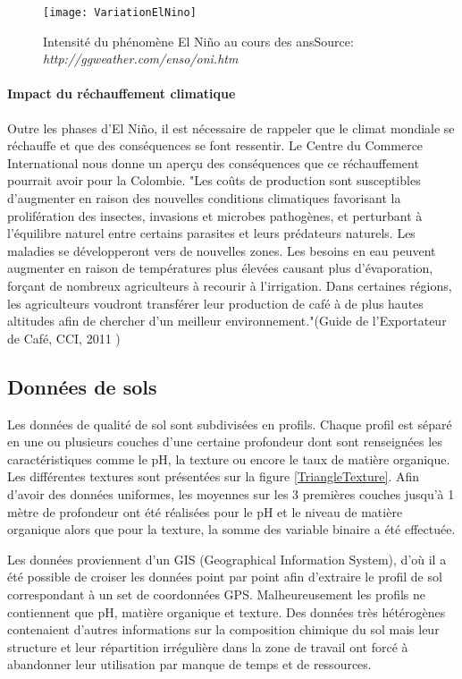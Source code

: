 \begin{figure}[H]
	\texttt{[image: VariationElNino]}
	\caption{\label{Nino} Intensité du phénomène El Niño au cours des ans\newline Source: \textit{http://ggweather.com/enso/oni.htm}}
\end{figure}

\paragraph{Impact du réchauffement climatique} Outre les phases d'El Niño, il est nécessaire de rappeler que le climat mondiale se réchauffe et que des conséquences se font ressentir. Le Centre du Commerce International \cite{CCI} nous donne un aperçu des conséquences que ce réchauffement pourrait avoir pour la Colombie. "Les coûts de production sont susceptibles d'augmenter en raison des nouvelles conditions climatiques favorisant la prolifération des insectes, invasions et microbes pathogènes, et perturbant à l'équilibre naturel entre certains parasites et leurs prédateurs naturels. Les maladies se développeront vers de nouvelles zones. Les besoins en eau peuvent augmenter en raison de températures plus élevées causant plus d'évaporation, forçant de nombreux agriculteurs à recourir à l'irrigation. Dans certaines régions, les agriculteurs voudront transférer leur production de café à de plus hautes altitudes afin de chercher d'un meilleur environnement."(Guide de l'Exportateur de Café, CCI, 2011 \cite{GuideCafe})


\subsection{Données de sols} 
Les données de qualité de sol sont subdivisées en profils. Chaque profil est séparé en une ou plusieurs couches d’une certaine profondeur dont sont renseignées les caractéristiques comme le pH, la texture ou encore le taux de matière organique. Les différentes textures sont présentées sur la figure \ref{TriangleTexture}. Afin d'avoir des données uniformes, les moyennes sur les 3 premières couches jusqu'à 1 mètre de profondeur ont été réalisées pour le pH et le niveau de matière organique alors que pour la texture, la somme des variable binaire a été effectuée. 

Les données proviennent d'un GIS (Geographical Information System), d'où il a été possible de croiser les données point par point afin d'extraire le profil de sol correspondant à un set de coordonnées GPS. Malheureusement les profils ne contiennent que pH, matière organique et texture. Des données très hétérogènes contenaient d'autres informations sur la composition chimique du sol mais leur structure et leur répartition irrégulière dans la zone de travail ont forcé à abandonner leur utilisation par manque de temps et de ressources.

